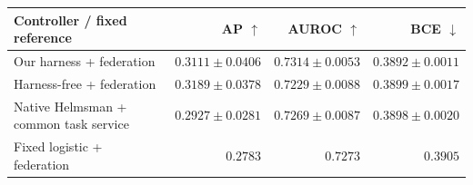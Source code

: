\centering\small\setlength{\tabcolsep}{4pt}
\begin{tabularx}{\linewidth}{Xrrr}
\toprule
Controller / fixed reference & AP $\uparrow$ & AUROC $\uparrow$ & BCE $\downarrow$ \\
\midrule
Our harness + federation & $0.3111\pm0.0406$ & $0.7314\pm0.0053$ & $0.3892\pm0.0011$ \\
Harness-free + federation & $0.3189\pm0.0378$ & $0.7229\pm0.0088$ & $0.3899\pm0.0017$ \\
Native Helmsman + common task service & $0.2927\pm0.0281$ & $0.7269\pm0.0087$ & $0.3898\pm0.0020$ \\
Fixed logistic + federation & $0.2783$ & $0.7273$ & $0.3905$ \\
\bottomrule
\end{tabularx}
\caption{Training-only CV-guided research. Mean and sample SD over all eight research trajectories per controller, with identical 491 training rows, ten simulated clients and three fixed compound folds. All 24 source selections close before full-data deployment and the 25 final labels are scored. The single unchanged reference has no invented seed variance. Native Helmsman retains its first-valid-execution stop; unused opportunities and actual costs are reported separately.}
\label{tab:federated-cv-v2}
